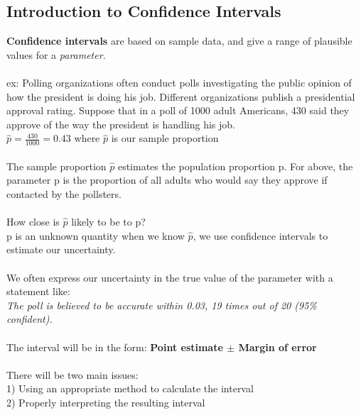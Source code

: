 \documentclass[12pt, a4paper]{article}
\begin{document}
	\subsection{Introduction to Confidence Intervals}
	 \textbf{Confidence intervals} are based on sample data, and give a range of plausible values for a \textit{parameter}. \\~\\
	 ex: Polling organizations often conduct polls investigating the public opinion of how the president is doing his job. Different organizations publish a presidential approval rating. Suppose that in a poll of 1000 adult Americans, 430 said they approve of the way the president is handling his job. \\
	 $\hat{p} = \frac{430}{1000} = 0.43$ where $\hat{p}$ is our sample proportion \\~\\
	 The sample proportion $\hat{p}$ estimates the population proportion p. For above, the parameter p is the proportion of all adults who would say they approve if contacted by the pollsters. \\~\\
	 How close is $\hat{p}$ likely to be to p? \\
	 p is an unknown quantity when we know $\hat{p}$, we use confidence intervals to estimate our uncertainty. \\~\\
	 We often express our uncertainty in the true value of the parameter with a statement like: \\
	 \textit{The poll is believed to be accurate within 0.03, 19 times out of 20 (95\% confident).} \\~\\
	 The interval will be in the form: \textbf{Point estimate $\pm$ Margin of error} \\~\\
	 There will be two main issues: \\
	 1) Using an appropriate method to calculate the interval \\
	 2) Properly interpreting the resulting interval \\~\\
	 
\end{document}

